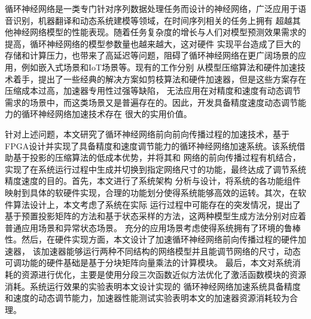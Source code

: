	
\begin{chineseabstract}
循环神经网络是一类专门针对序列数据处理任务而设计的神经网络，广泛应用于语音识别，机器翻译和动态系统建模等领域，在时间序列相关的任务上拥有
超越其他神经网络模型的性能表现。随着任务复杂度的增长与人们对模型预测效果需求的提高，循环神经网络的模型参数量也越来越大，这对硬件
实现平台造成了巨大的存储和计算压力，也带来了高延迟等问题，阻碍了循环神经网络在更广阔场景的应用，例如嵌入式场景和IoT场景等。现有的工作分别
从模型压缩算法和硬件加速技术着手，提出了一些经典的解决方案如剪枝算法和硬件加速器，但是这些方案存在压缩成本过高，加速器专用性过强等缺陷，
无法应用在对精度和速度有动态调节需求的场景中，而这类场景又是普遍存在的。因此，开发具备精度速度动态调节能力的循环神经网络加速技术存在
很大的实用价值。

针对上述问题，本文研究了循环神经网络前向前向传播过程的加速技术，基于FPGA设计并实现了具备精度和速度调节能力的循环神经网络加速系统。该系统借助基于投影的压缩算法的低成本优势，并将其和
网络的前向传播过程有机结合，实现了在系统运行过程中生成并切换到指定网络尺寸的功能，最终达成了调节系统精度速度的目的。首先，本文进行了系统架构
分析与设计，将系统的各功能组件映射到具体的软硬件实现，合理的功能划分使得系统能够高效的运转。其次，在软件算法设计上，本文考虑了系统在实际
运行过程中可能存在的突发情况，提出了基于预置投影矩阵的方法和基于状态采样的方法，这两种模型生成方法分别对应着普通应用场景和异常状态场景。
充分的应用场景考虑使得系统拥有了环境的鲁棒性。然后，在硬件实现方面，本文设计了加速循环神经网络前向传播过程的硬件加速器，
该加速器能够运行两种不同结构的网络模型并且能调节网络的尺寸，动态可调功能的硬件基础是基于分块矩阵向量乘法的计算模块。
最后，本文对系统消耗的资源进行优化，主要是使用分段三次函数近似方法优化了激活函数模块的资源消耗。系统运行效果的实验表明本文设计实现的
循环神经网络加速系统具备精度和速度的动态调节能力，加速器性能测试实验表明本文的加速器资源消耗较为合理。



\end{chineseabstract}

